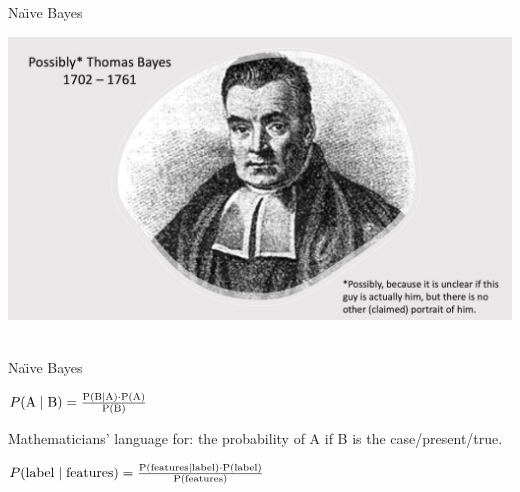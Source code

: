 \documentclass[handout]{beamer}
\begin{document}
\begin{frame}{Na\"{\i}ve Bayes}
	
	\begin{center}
		\includegraphics[width=\linewidth,height=\textheight,keepaspectratio]{../pictures/ThomasBayes.png} \\\
	\end{center}
	
	
	
	
\end{frame}



\begin{frame}{Na\"{\i}ve Bayes}
	
	$ P(\rm{A} \mid \rm{B}) = \frac{P(\rm{B} \mid \rm{A}) \cdot P(\rm{A})}{P(\rm{B})} $
	
	Mathematicians’ language for: the probability of A if B is the case/present/true. 
	
	$ P(\rm{label} \mid \rm{features}) = \frac{P(\rm{features} \mid \rm{label}) \cdot P(\rm{label})}{P(\rm{features})} $
	
	
	
	

\end{frame}
\end{document}

